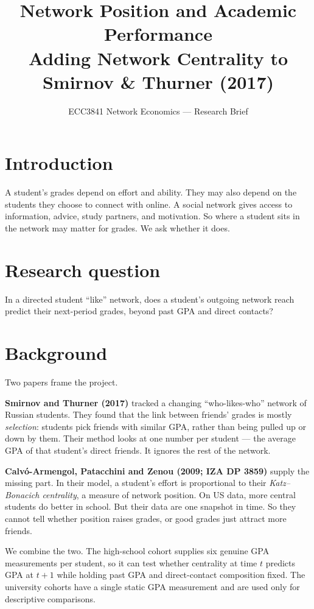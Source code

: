 \documentclass[11pt]{article}
\title{\vspace{-2em}\textbf{\LARGE Network Position and Academic Performance}\\[0.4em]
\large Adding Network Centrality to Smirnov \& Thurner (2017)}
\author{}
\date{ECC3841 Network Economics --- Research Brief}
\begin{document}
\maketitle
\vspace{-2.5em}

\section*{Introduction}

A student's grades depend on effort and ability. They may also depend on the students
they choose to connect with online. A social network gives access to information, advice, study partners, and
motivation. So where a student sits in the network may matter for grades. We ask
whether it does.

\section*{Research question}

In a directed student ``like'' network, does a student's outgoing network reach predict
their next-period grades, beyond past GPA and direct contacts?

\section*{Background}

Two papers frame the project.

\textbf{Smirnov and Thurner (2017)} tracked a changing ``who-likes-who'' network of
Russian students. They found that the link between friends' grades is mostly
\emph{selection}: students pick friends with similar GPA, rather than being pulled up or
down by them. Their method looks at one number per student --- the average GPA of that
student's direct friends. It ignores the rest of the network.

\textbf{Calvó-Armengol, Patacchini and Zenou (2009; IZA DP 3859)} supply the missing
part. In their model, a student's effort is proportional to their \emph{Katz--Bonacich
centrality}, a measure of network position. On US data, more central students do better
in school. But their data are one snapshot in time. So they cannot tell whether
position raises grades, or good grades just attract more friends.

We combine the two. The high-school cohort supplies six genuine GPA measurements per
student, so it can test whether centrality at time $t$ predicts GPA at $t+1$ while
holding past GPA and direct-contact composition fixed. The university cohorts have a
single static GPA measurement and are used only for descriptive comparisons.
\end{document}
